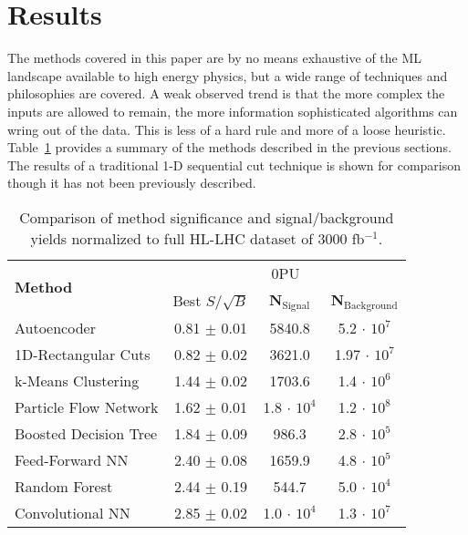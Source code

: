 \section{Results}
\label{sec:results}

The methods covered in this paper are by no means exhaustive of the ML landscape available to high energy physics, but a wide range of techniques and philosophies are covered. A weak observed trend is that the more complex the inputs are allowed to remain, the more information sophisticated algorithms can wring out of the data. This is less of a hard rule and more of a loose heuristic. Table~\ref{tab:summary} provides a summary of the methods described in the previous sections. The results of a traditional 1-D sequential cut technique is shown for comparison though it has not been previously described. 

\begin{table}[h!]
\label{tab:summary}
  \begin{center}
  \begin{tabular}{|l|c|c|c|} %
      \hline\hline
      \multirow{2}{*}{\textbf{Method}} & \multicolumn{3}{c|}{0PU} \\
      \cline{2-4}
      & Best $S/\sqrt{B}$ & \textbf{N$_{\mathrm{Signal}}$} & \textbf{N$_{\mathrm{Background}}$} \\
      \hline
      Autoencoder           & 0.81 $\pm$ 0.01 & 5840.8 & 5.2 $\cdot$ $10^7$ \\
      1D-Rectangular Cuts   & 0.82 $\pm$ 0.02 & 3621.0 & 1.97 $\cdot$ $10^7$ \\
      k-Means Clustering    & 1.44 $\pm$ 0.02 & 1703.6 & 1.4 $\cdot$ $10^6$ \\
      Particle Flow Network & 1.62 $\pm$ 0.01 & 1.8 $\cdot$ $10^4$ & 1.2 $\cdot$ $10^8$ \\
      Boosted Decision Tree & 1.84 $\pm$ 0.09 & 986.3  & 2.8 $\cdot$ $10^5$ \\
      Feed-Forward NN       & 2.40 $\pm$ 0.08 & 1659.9 & 4.8 $\cdot$ $10^5$ \\
      Random Forest         & 2.44 $\pm$ 0.19 & 544.7 & 5.0 $\cdot$ $10^4$ \\
      Convolutional NN      & 2.85 $\pm$ 0.02 & 1.0 $\cdot$ $10^4$ & 1.3 $\cdot$ $10^7$ \\
      \hline\hline
    \end{tabular}
    \caption{Comparison of method significance and signal/background yields normalized to full HL-LHC dataset of 3000 fb$^{-1}$.}
  \end{center}
\end{table}

